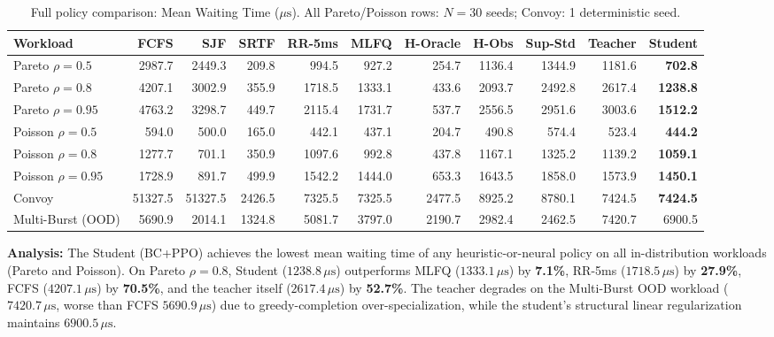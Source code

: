 \begin{table}[t]
  \centering
  \caption{Full policy comparison: Mean Waiting Time ($\mu\text{s}$). All
    Pareto/Poisson rows: $N = 30$ seeds; Convoy: 1 deterministic seed.}
  \label{tab:v4}
  \scriptsize
  \setlength{\tabcolsep}{4pt}
  \begin{tabular}{lrrrrrrrrrr}
    \toprule
    \textbf{Workload} & \textbf{FCFS} & \textbf{SJF} & \textbf{SRTF}
      & \textbf{RR-5ms} & \textbf{MLFQ} & \textbf{H-Oracle}
      & \textbf{H-Obs} & \textbf{Sup-Std} & \textbf{Teacher} & \textbf{Student} \\
    \midrule
    Pareto $\rho = 0.5$  & 2987.7 & 2449.3 &  209.8 &  994.5 &  927.2 & 254.7 & 1136.4 & 1344.9 & 1181.6 &  \textbf{702.8} \\
    Pareto $\rho = 0.8$  & 4207.1 & 3002.9 &  355.9 & 1718.5 & 1333.1 & 433.6 & 2093.7 & 2492.8 & 2617.4 & \textbf{1238.8} \\
    Pareto $\rho = 0.95$ & 4763.2 & 3298.7 &  449.7 & 2115.4 & 1731.7 & 537.7 & 2556.5 & 2951.6 & 3003.6 & \textbf{1512.2} \\
    Poisson $\rho = 0.5$ &  594.0 &  500.0 &  165.0 &  442.1 &  437.1 & 204.7 &  490.8 &  574.4 &  523.4 &  \textbf{444.2} \\
    Poisson $\rho = 0.8$ & 1277.7 &  701.1 &  350.9 & 1097.6 &  992.8 & 437.8 & 1167.1 & 1325.2 & 1139.2 & \textbf{1059.1} \\
    Poisson $\rho = 0.95$& 1728.9 &  891.7 &  499.9 & 1542.2 & 1444.0 & 653.3 & 1643.5 & 1858.0 & 1573.9 & \textbf{1450.1} \\
    Convoy               &51327.5 &51327.5 & 2426.5 & 7325.5 & 7325.5 &2477.5 & 8925.2 & 8780.1 & 7424.5 & \textbf{7424.5} \\
    Multi-Burst (OOD)    & 5690.9 & 2014.1 & 1324.8 & 5081.7 & 3797.0 &2190.7 & 2982.4 & 2462.5 & 7420.7 & 6900.5 \\
    \bottomrule
  \end{tabular}
\end{table}

\textbf{Analysis:} The Student (BC+PPO) achieves the lowest mean waiting time
of any heuristic-or-neural policy on all in-distribution workloads (Pareto and
Poisson). On Pareto $\rho = 0.8$, Student ($1238.8\,\mu\text{s}$)
outperforms MLFQ ($1333.1\,\mu\text{s}$) by \textbf{7.1\%}, RR-5ms
($1718.5\,\mu\text{s}$) by \textbf{27.9\%}, FCFS
($4207.1\,\mu\text{s}$) by \textbf{70.5\%}, and the teacher itself
($2617.4\,\mu\text{s}$) by \textbf{52.7\%}. The teacher degrades on
the Multi-Burst OOD workload ($7420.7\,\mu\text{s}$, worse than FCFS
$5690.9\,\mu\text{s}$) due to greedy-completion over-specialization, while
the student's structural linear regularization maintains $6900.5\,\mu\text{s}$.

